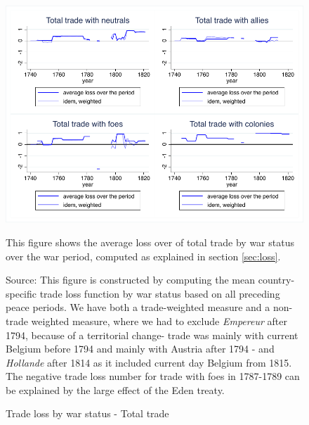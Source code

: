 \documentclass[12pt,a4paper,notitlepage,english]{article}
\newcommand{\fontsmall}{\fontsize{10pt}{12pt}\selectfont}
\newcommand{\source}[1]{\caption*{\footnotesize Source: {#1}} }
\begin{document}
\begin{appendix}
\begin{figure}[h!]
\centering
\caption{Trade loss by war status - Total trade}
\label{fig:loss_by_war_status_XI}
\includegraphics[scale=.17]{loss_by_war_status_XI}
\begin{minipage}{.95\textwidth}
\fontsmall 
This figure shows the average loss over of total trade by war status over the war period, computed as explained in section \ref{sec:loss}. 
\source{This figure is constructed by computing the mean country-specific trade loss function by war status based on all preceding peace periods.
We have both a trade-weighted measure and a non-trade weighted measure, where we had to exclude \textit{Empereur} after 1794, because of a territorial change- trade was mainly with current Belgium before 1794 and mainly with Austria after 1794 - and \textit{Hollande} after 1814 as it included current day Belgium from 1815.
The negative trade loss number for trade with foes in 1787-1789 can be explained by the large effect of the Eden treaty.}
\end{minipage}
\end{figure}


\end{appendix}
\end{document}

